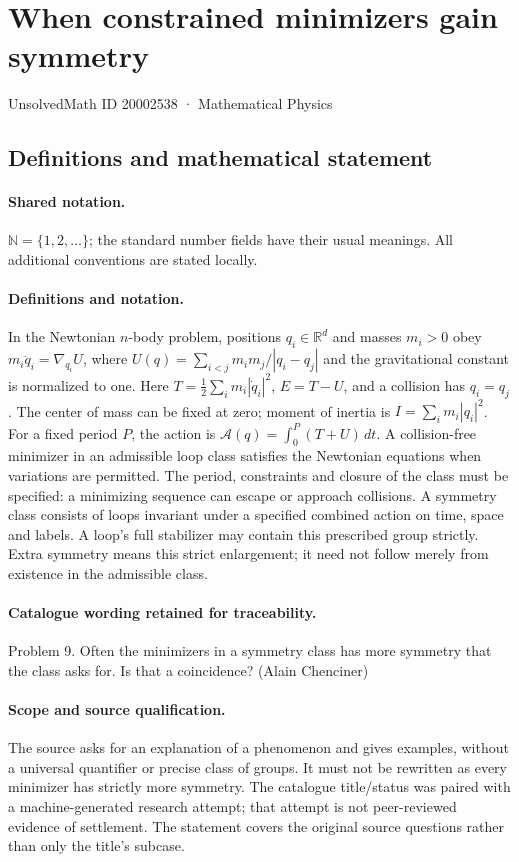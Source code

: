 \documentclass[11pt]{article}
\begin{document}
\setcounter{section}{20002537}
\section{When constrained minimizers gain symmetry}\label{20002538}
{\small UnsolvedMath ID 20002538 · Mathematical Physics}
\subsection{Definitions and mathematical statement}

\paragraph{Shared notation.}$\mathbb N=\{1,2,\ldots\}$; the standard number fields have their usual meanings. All additional conventions are stated locally.


\paragraph{Definitions and notation.}In the Newtonian $n$-body problem, positions $q_i\in\mathbb R^d$ and masses $m_i>0$ obey $m_i\ddot q_i=\nabla_{q_i}U$, where $U(q)=\sum_{i<j}m_im_j/|q_i-q_j|$ and the gravitational constant is normalized to one. Here $T=\tfrac12\sum_i m_i|\dot q_i|^2$, $E=T-U$, and a collision has $q_i=q_j$. The center of mass can be fixed at zero; moment of inertia is $I=\sum_i m_i|q_i|^2$. For a fixed period $P$, the action is $\mathcal A(q)=\int_0^P(T+U)\,dt$. A collision-free minimizer in an admissible loop class satisfies the Newtonian equations when variations are permitted. The period, constraints and closure of the class must be specified: a minimizing sequence can escape or approach collisions. A symmetry class consists of loops invariant under a specified combined action on time, space and labels. A loop’s full stabilizer may contain this prescribed group strictly. Extra symmetry means this strict enlargement; it need not follow merely from existence in the admissible class.

\paragraph{Catalogue wording retained for traceability.}
Problem 9. Often the minimizers in a symmetry class has more symmetry that the class asks for. Is that a coincidence? (Alain Chenciner)
\paragraph{Scope and source qualification.}The source asks for an explanation of a phenomenon and gives examples, without a universal quantifier or precise class of groups. It must not be rewritten as every minimizer has strictly more symmetry. The catalogue title/status was paired with a machine-generated research attempt; that attempt is not peer-reviewed evidence of settlement. The statement covers the original source questions rather than only the title’s subcase.
\end{document}
